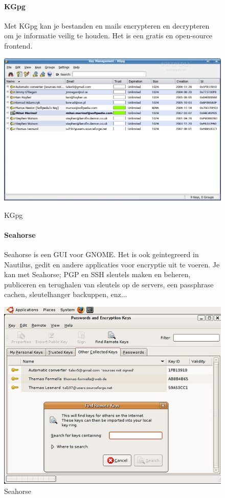 \documentclass[12pt]{article}
\begin{document}
				\begin{figure}[!ht]				
					\paragraph{KGpg}\cite{Kgpg}
						Met KGpg kan je bestanden en mails encrypteren en decrypteren om je 									informatie veilig te houden.
						Het is een gratis en open-source frontend.
					\begin{center}
						\includegraphics[scale=0.2]{Pictures/kgpg}
					\end{center}
					\caption{KGpg}
				
					\paragraph{Seahorse} \cite{Seahorse}
						Seahorse is een GUI voor GNOME. Het is ook geintegreerd in Nautilus, gedit 								en andere applicaties voor encryptie uit te voeren.
						Je kan met Seahorse; PGP en SSH sleutels maken en beheren, publiceren en 								terughalen van sleutels op de servers, een passphrase cachen, 											sleutelhanger backuppen, enz...
					\begin{center}
						\includegraphics[scale=0.4]{Pictures/Seahorse}
					\end{center}
					\caption{Seahorse}
				\end{figure}
				
\end{document}

